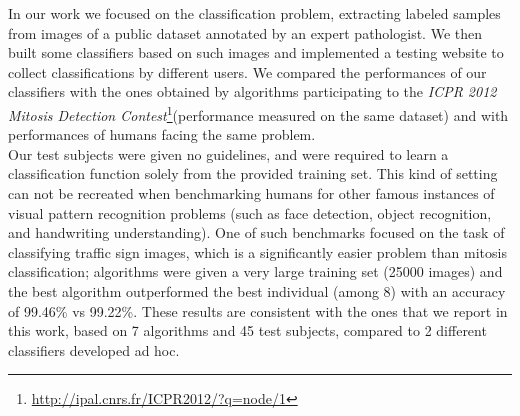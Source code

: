\vspace{0.5cm}

In our work we focused on the classification problem, extracting labeled samples from images of a public dataset annotated by an expert pathologist.
We then built some classifiers based on such images and implemented a testing website to collect classifications by different users.
We compared the performances of our classifiers with the ones obtained by algorithms participating to the 
\textit{ICPR 2012 Mitosis Detection Contest}\footnote{\url{http://ipal.cnrs.fr/ICPR2012/?q=node/1}}(performance measured on the same dataset) and with performances of humans facing the same problem.\\
Our test subjects were given no guidelines, and were required to
learn a classification function solely from the provided training set.
This kind of setting can not be recreated when benchmarking humans for other famous instances of visual pattern recognition problems (such as
face detection, object recognition, and handwriting understanding). One of such
benchmarks \cite{ML_traffic} focused on the task of classifying traffic sign images, which is a
significantly easier problem than mitosis classification; algorithms were given a
very large training set (25000 images) and the best algorithm outperformed the best
individual (among 8) with an accuracy of 99.46\% vs 99.22\%.
These results are consistent with the ones that we report in this work, based on 7 algorithms and 45 test subjects, compared to 2 different classifiers developed ad hoc.




\vspace{0.5cm}


